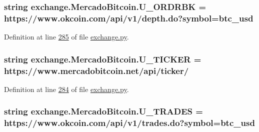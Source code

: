 \subsubsection[{\texorpdfstring{U\+\_\+\+O\+R\+D\+R\+BK}{U_ORDRBK}}]{\setlength{\rightskip}{0pt plus 5cm}string exchange.\+Mercado\+Bitcoin.\+U\+\_\+\+O\+R\+D\+R\+BK = \textquotesingle{}https\+://www.\+okcoin.\+com/api/v1/depth.\+do?symbol=btc\+\_\+usd\textquotesingle{}\hspace{0.3cm}{\ttfamily [static]}}\hypertarget{classexchange_1_1_mercado_bitcoin_a7dd22c2c0261557a694678d8057d2547}{}\label{classexchange_1_1_mercado_bitcoin_a7dd22c2c0261557a694678d8057d2547}


Definition at line \hyperlink{exchange_8py_source_l00285}{285} of file \hyperlink{exchange_8py_source}{exchange.\+py}.

\subsubsection[{\texorpdfstring{U\+\_\+\+T\+I\+C\+K\+ER}{U_TICKER}}]{\setlength{\rightskip}{0pt plus 5cm}string exchange.\+Mercado\+Bitcoin.\+U\+\_\+\+T\+I\+C\+K\+ER = \textquotesingle{}https\+://www.\+mercadobitcoin.\+net/api/{\bf ticker}/\textquotesingle{}\hspace{0.3cm}{\ttfamily [static]}}\hypertarget{classexchange_1_1_mercado_bitcoin_a310b7df5ae9e8a46bad918428c67d4e8}{}\label{classexchange_1_1_mercado_bitcoin_a310b7df5ae9e8a46bad918428c67d4e8}


Definition at line \hyperlink{exchange_8py_source_l00284}{284} of file \hyperlink{exchange_8py_source}{exchange.\+py}.

\subsubsection[{\texorpdfstring{U\+\_\+\+T\+R\+A\+D\+ES}{U_TRADES}}]{\setlength{\rightskip}{0pt plus 5cm}string exchange.\+Mercado\+Bitcoin.\+U\+\_\+\+T\+R\+A\+D\+ES = \textquotesingle{}https\+://www.\+okcoin.\+com/api/v1/trades.\+do?symbol=btc\+\_\+usd\textquotesingle{}\hspace{0.3cm}{\ttfamily [static]}}\hypertarget{classexchange_1_1_mercado_bitcoin_a20ad6407ef07ab8a55d3c022d1512a5d}{}\label{classexchange_1_1_mercado_bitcoin_a20ad6407ef07ab8a55d3c022d1512a5d}


